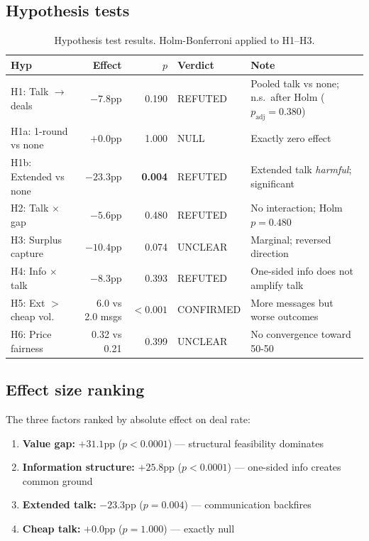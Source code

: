 \documentclass[11pt]{article}
\begin{document}
\subsection{Hypothesis tests}

\begin{table}[htbp]
\centering
\small
\begin{tabularx}{\textwidth}{@{}l r r l Y@{}}
\toprule
\textbf{Hyp} & \textbf{Effect} & \textbf{$p$} & \textbf{Verdict} & \textbf{Note} \\
\midrule
H1: Talk $\to$ deals & $-7.8$pp & 0.190 & REFUTED & Pooled talk vs none; n.s.\ after Holm ($p_{\text{adj}}=0.380$) \\
H1a: 1-round vs none & $+0.0$pp & 1.000 & NULL & Exactly zero effect \\
H1b: Extended vs none & $-23.3$pp & \textbf{0.004} & REFUTED & Extended talk \emph{harmful}; significant \\
H2: Talk $\times$ gap & $-5.6$pp & 0.480 & REFUTED & No interaction; Holm $p=0.480$ \\
H3: Surplus capture & $-10.4$pp & 0.074 & UNCLEAR & Marginal; reversed direction \\
H4: Info $\times$ talk & $-8.3$pp & 0.393 & REFUTED & One-sided info does not amplify talk \\
H5: Ext $>$ cheap vol. & 6.0 vs 2.0 msgs & $<0.001$ & CONFIRMED & More messages but worse outcomes \\
H6: Price fairness & 0.32 vs 0.21 & 0.399 & UNCLEAR & No convergence toward 50-50 \\
\bottomrule
\end{tabularx}
\caption{Hypothesis test results. Holm-Bonferroni applied to H1--H3.}
\label{tab:hypotheses}
\end{table}

\subsection{Effect size ranking}

The three factors ranked by absolute effect on deal rate:
\begin{enumerate}
\item \textbf{Value gap:} $+31.1$pp ($p < 0.0001$) --- structural feasibility dominates
\item \textbf{Information structure:} $+25.8$pp ($p < 0.0001$) --- one-sided info creates common ground
\item \textbf{Extended talk:} $-23.3$pp ($p = 0.004$) --- communication backfires
\item \textbf{Cheap talk:} $+0.0$pp ($p = 1.000$) --- exactly null
\end{enumerate}
\end{document}
